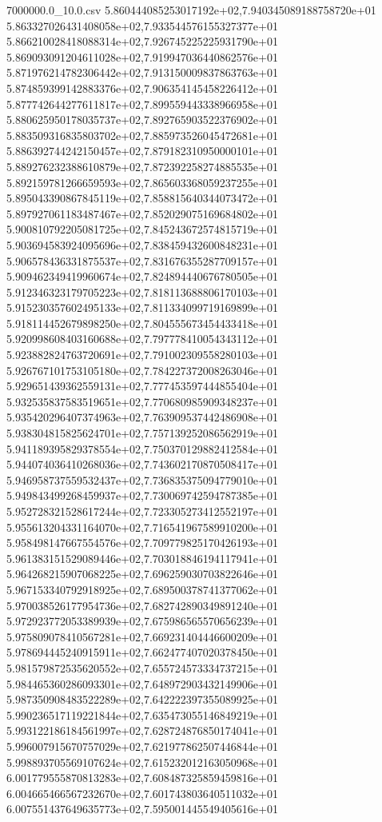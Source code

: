 \begin{filecontents*}{7000000.0_10.0.csv}
5.860444085253017192e+02,7.940345089188758720e+01
5.863327026431408058e+02,7.933544576155327377e+01
5.866210028418088314e+02,7.926745225225931790e+01
5.869093091204611028e+02,7.919947036440862576e+01
5.871976214782306442e+02,7.913150009837863763e+01
5.874859399142883376e+02,7.906354145458226412e+01
5.877742644277611817e+02,7.899559443338966958e+01
5.880625950178035737e+02,7.892765903522376902e+01
5.883509316835803702e+02,7.885973526045472681e+01
5.886392744242150457e+02,7.879182310950000101e+01
5.889276232388610879e+02,7.872392258274885535e+01
5.892159781266659593e+02,7.865603368059237255e+01
5.895043390867845119e+02,7.858815640344073472e+01
5.897927061183487467e+02,7.852029075169684802e+01
5.900810792205081725e+02,7.845243672574815719e+01
5.903694583924095696e+02,7.838459432600848231e+01
5.906578436331875537e+02,7.831676355287709157e+01
5.909462349419960674e+02,7.824894440676780505e+01
5.912346323179705223e+02,7.818113688806170103e+01
5.915230357602495133e+02,7.811334099719169899e+01
5.918114452679898250e+02,7.804555673454433418e+01
5.920998608403160688e+02,7.797778410054343112e+01
5.923882824763720691e+02,7.791002309558280103e+01
5.926767101753105180e+02,7.784227372008263046e+01
5.929651439362559131e+02,7.777453597444855404e+01
5.932535837583519651e+02,7.770680985909348237e+01
5.935420296407374963e+02,7.763909537442486908e+01
5.938304815825624701e+02,7.757139252086562919e+01
5.941189395829378554e+02,7.750370129882412584e+01
5.944074036410268036e+02,7.743602170870508417e+01
5.946958737559532437e+02,7.736835375094779010e+01
5.949843499268459937e+02,7.730069742594787385e+01
5.952728321528617244e+02,7.723305273412552197e+01
5.955613204331164070e+02,7.716541967589910200e+01
5.958498147667554576e+02,7.709779825170426193e+01
5.961383151529089446e+02,7.703018846194117941e+01
5.964268215907068225e+02,7.696259030703822646e+01
5.967153340792918925e+02,7.689500378741377062e+01
5.970038526177954736e+02,7.682742890349891240e+01
5.972923772053389939e+02,7.675986565570656239e+01
5.975809078410567281e+02,7.669231404446600209e+01
5.978694445240915911e+02,7.662477407020378450e+01
5.981579872535620552e+02,7.655724573334737215e+01
5.984465360286093301e+02,7.648972903432149906e+01
5.987350908483522289e+02,7.642222397355089925e+01
5.990236517119221844e+02,7.635473055146849219e+01
5.993122186184561997e+02,7.628724876850174041e+01
5.996007915670757029e+02,7.621977862507446844e+01
5.998893705569107624e+02,7.615232012163050968e+01
6.001779555870813283e+02,7.608487325859459816e+01
6.004665466567232670e+02,7.601743803640511032e+01
6.007551437649635773e+02,7.595001445549405616e+01

\end{filecontents*}
